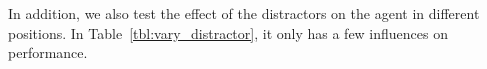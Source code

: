 In addition, we also test the effect of the distractors on the agent in different positions. In Table~\ref{tbl:vary_distractor}, it only has a few influences on performance.

